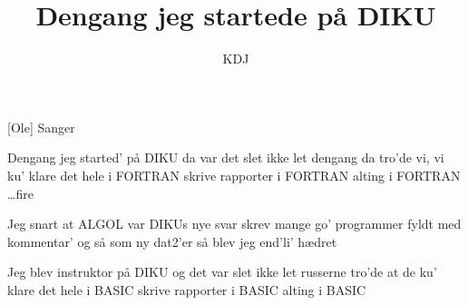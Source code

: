 \documentclass[a4paper,11pt]{article}
\title{Dengang jeg startede på DIKU}
\author{KDJ}
\begin{document}
\maketitle

\begin{roles}
[Ole] Sanger 
\end{roles}

\begin{song}
     Dengang jeg started' på DIKU
              da var det slet ikke let
              dengang da tro'de vi, vi ku'
              klare det hele
              i FORTRAN
              skrive rapporter
              i FORTRAN
              alting i FORTRAN \ldots fire


     Jeg snart at ALGOL
              var DIKUs nye svar
              skrev mange go' programmer
              fyldt med kommentar'
              og så som ny dat2'er
              så blev jeg end'li' hædret

     Jeg blev instruktor på DIKU
              og det var slet ikke let
              russerne tro'de at de ku'
              klare det hele
              i BASIC
              skrive rapporter
              i BASIC
              alting i BASIC

\end{song}
\end{document}
